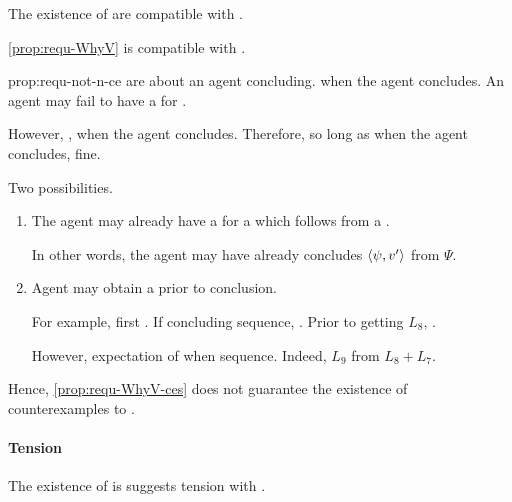 \begin{note}
  The existence of  are compatible with \issueConstraint{}.

  \begin{observation}%
    \label{prop:requ-not-n-ce}%
    \autoref{prop:requ-WhyV} is compatible with \issueConstraint{}.
  \end{observation}

  \begin{motivation}{prop:requ-not-n-ce}
     are about an agent concluding.
    \fc{} when the agent concludes.
    An agent may fail to have a \wit{} for \fc{}.

    However, \issueConstraint{}, \wit{} when the agent concludes.
    Therefore, so long as \wit{} when the agent concludes, fine.

    Two possibilities.
    \begin{enumerate}
    \item
      The agent may already have a \wit{} for a \ros{} which follows from a \fc{}.

      In other words, the agent may have already concludes \(\langle \psi, v' \rangle\) from \(\Psi\).
    \item
      Agent may obtain a \wit{} prior to conclusion.

      For example, first .
      If concluding sequence, \fc{}.
      Prior to getting \(L_{8}\), \fc{}.

      However, expectation of \wit{} when sequence.
      Indeed, \(L_{9}\) from \(L_{8} + L_{7}\).
    \end{enumerate}
    \vspace{-\baselineskip}
  \end{motivation}

  \noindent%
  Hence, \autoref{prop:requ-WhyV-ces} does not guarantee the existence of counterexamples to \issueConstraint{}.
\end{note}



\paragraph*{Tension}


\begin{note}
  The existence of  is suggests tension with \issueConstraint{}.
\end{note}

